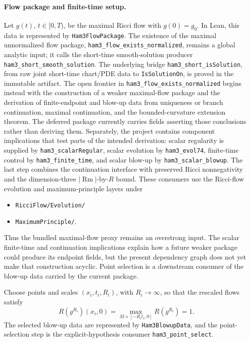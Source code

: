 \documentclass[11pt]{article}
\theoremstyle{plain}
\theoremstyle{definition}
\theoremstyle{remark}
\newcommand{\Rm}{\operatorname{Rm}}
\newcommand{\norm}[1]{\left|#1\right|}
\newcommand{\leanref}[1]{\nolinkurl{#1}}
\newcommand{\leanfile}[1]{\nolinkurl{#1}}
\newcommand{\rfdir}[1]{\leanfile{#1/}}
\begin{document}
\paragraph{Flow package and finite-time setup.}
Let $g(t)$, $t\in[0,T)$, be the maximal Ricci flow with $g(0)=g_0$.  In Lean,
this data is represented by \leanref{Ham3FlowPackage}.  The existence of the
maximal unnormalized flow package, \leanref{ham3_flow_exists_normalized}, remains
a global analytic input; it calls the
short-time smooth-solution producer \leanref{ham3_short_smooth_solution}.  The
underlying bridge \leanref{ham3_short_isSolution}, from raw joint short-time
chart/PDE data to \leanref{IsSolutionOn}, is proved in the immutable artifact.
The open frontier in \leanref{ham3_flow_exists_normalized} begins instead with
the construction of a weaker maximal-flow package and the derivation of
finite-endpoint and blow-up data from uniqueness or branch continuation,
maximal continuation, and the bounded-curvature extension theorem.  The
deferred package currently carries
fields asserting those conclusions rather than deriving them.  Separately,
the project contains component implications that test parts of
the intended derivation: scalar regularity is supplied by
\leanref{ham3_scalarRegular}, scalar evolution by \leanref{ham3_evol74},
finite-time control by \leanref{ham3_finite_time}, and scalar blow-up by
\leanref{ham3_scalar_blowup}.  The last step combines the continuation
interface with preserved Ricci nonnegativity and the dimension-three
\(\norm{\Rm}\)-by-\(R\) bound.  These consumers use the Ricci-flow evolution
and maximum-principle layers under
\begin{itemize}[leftmargin=2em]
  \item \rfdir{RicciFlow/Evolution}
  \item \rfdir{MaximumPrinciple}.
\end{itemize}
Thus the bundled maximal-flow proxy remains an overstrong input.  The scalar
finite-time and continuation implications explain how a future weaker package
could produce its endpoint fields, but the present dependency graph does not
yet make that construction acyclic.  Point selection is a downstream consumer
of the blow-up data carried by the current package.

Choose points and scales \((x_i,t_i,R_i)\), with \(R_i\to\infty\), so that the
rescaled flows satisfy
\[
R(g^{R_i})(x_i,0)=
\max_{M\times[-R_it_i,0]}R(g^{R_i})=1.
\]
The selected blow-up data are represented by \leanref{Ham3BlowupData}, and the
point-selection step is the explicit-hypothesis consumer
\leanref{ham3_point_select}.
\end{document}
